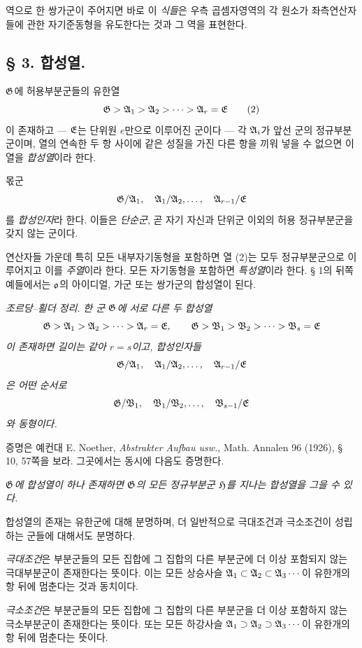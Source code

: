 역으로 한 쌍가군이 주어지면 바로 이 \emph{식들}은 우측 곱셈자영역의 각 원소가 좌측연산자들에 관한 자기준동형을 유도한다는 것과 그 역을 표현한다.

\subsection*{§ 3. 합성열.}

\(\mathfrak G\)에 허용부분군들의 유한열
\[
        \mathfrak G>\mathfrak A_1>\mathfrak A_2>\cdots>\mathfrak A_r=\mathfrak E \tag{2}
\]
이 존재하고 --- \(\mathfrak E\)는 단위원 \(e\)만으로 이루어진 군이다 --- 각 \(\mathfrak A_i\)가 앞선 군의 정규부분군이며, 열의 연속한 두 항 사이에 같은 성질을 가진 다른 항을 끼워 넣을 수 없으면 이 열을 \emph{합성열}이라 한다.

몫군
\[
        \mathfrak G/\mathfrak A_1,\quad \mathfrak A_1/\mathfrak A_2,\ldots,\quad \mathfrak A_{r-1}/\mathfrak E
\]
를 \emph{합성인자}라 한다. 이들은 \emph{단순군}, 곧 자기 자신과 단위군 이외의 허용 정규부분군을 갖지 않는 군이다.

연산자들 가운데 특히 모든 내부자기동형을 포함하면 열 (2)는 모두 정규부분군으로 이루어지고 이를 \emph{주열}이라 한다. 모든 자기동형을 포함하면 \emph{특성열}이라 한다. § 1의 뒤쪽 예들에서는 \(\mathfrak o\)의 아이디얼, 가군 또는 쌍가군의 합성열이 된다.

\emph{조르당--횔더 정리.} \emph{한 군 \(\mathfrak G\)에 서로 다른 두 합성열}
\[
\mathfrak G>\mathfrak A_1>\mathfrak A_2>\cdots>\mathfrak A_r=\mathfrak E,
\qquad
\mathfrak G>\mathfrak B_1>\mathfrak B_2>\cdots>\mathfrak B_s=\mathfrak E
\]
\emph{이 존재하면 길이는 같아 \(r=s\)이고, 합성인자들}
\[
        \mathfrak G/\mathfrak A_1,\quad \mathfrak A_1/\mathfrak A_2,\ldots,\quad\mathfrak A_{r-1}/\mathfrak E
\]
\emph{은 어떤 순서로}
\[
        \mathfrak G/\mathfrak B_1,\quad \mathfrak B_1/\mathfrak B_2,\ldots,\quad\mathfrak B_{s-1}/\mathfrak E
\]
\emph{와 동형이다.}

증명은 예컨대 E. Noether, \emph{Abstrakter Aufbau usw.}, Math. Annalen 96 (1926), § 10, 57쪽을 보라. 그곳에서는 동시에 다음도 증명한다.

\emph{\(\mathfrak G\)에 합성열이 하나 존재하면 \(\mathfrak G\)의 모든 정규부분군 \(\mathfrak H\)를 지나는 합성열을 그을 수 있다.}

합성열의 존재는 유한군에 대해 분명하며, 더 일반적으로 극대조건과 극소조건이 성립하는 군들에 대해서도 분명하다.

\emph{극대조건}은 부분군들의 모든 집합에 그 집합의 다른 부분군에 더 이상 포함되지 않는 극대부분군이 존재한다는 뜻이다. 이는 모든 상승사슬 \(\mathfrak A_1\subset\mathfrak A_2\subset\mathfrak A_3\cdots\)이 유한개의 항 뒤에 멈춘다는 것과 동치이다.

\emph{극소조건}은 부분군들의 모든 집합에 그 집합의 다른 부분군을 더 이상 포함하지 않는 극소부분군이 존재한다는 뜻이다. 또는 모든 하강사슬 \(\mathfrak A_1\supset\mathfrak A_2\supset\mathfrak A_3\cdots\)이 유한개의 항 뒤에 멈춘다는 뜻이다.

